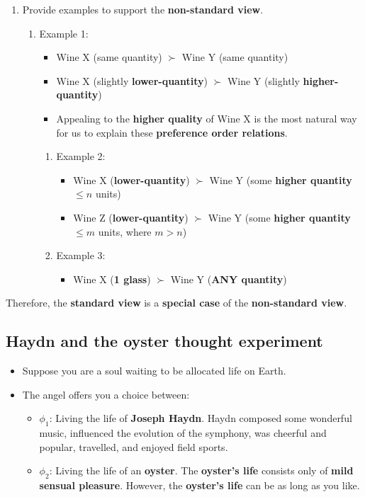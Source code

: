 \documentclass[11pt]{article}
\begin{document}
\begin{enumerate}
\item Provide examples to support the \textbf{non-standard view}.
\begin{enumerate}
\item Example 1:
\begin{itemize}
\item Wine X (same quantity) \(\succ\) Wine Y (same quantity)
\item Wine X (slightly \textbf{lower-quantity}) \(\succ\) Wine Y (slightly \textbf{higher-quantity})
\item Appealing to the \textbf{higher quality} of Wine X is the most natural way for us to explain these \textbf{preference order relations}.
\end{itemize}
\begin{enumerate}
\item Example 2:
\begin{itemize}
\item Wine X (\textbf{lower-quantity}) \(\succ\) Wine Y (some \textbf{higher quantity} \(\le n\) units)
\item Wine Z (\textbf{lower-quantity}) \(\succ\) Wine Y (some \textbf{higher quantity} \(\le m\) units, where \(m > n\))
\end{itemize}
\item Example 3:
\begin{itemize}
\item Wine X (\textbf{1 glass}) \(\succ\) Wine Y (\textbf{ANY quantity})
\end{itemize}
\end{enumerate}
\end{enumerate}
\end{enumerate}

Therefore, the \textbf{standard view} is a \textbf{special case} of the \textbf{non-standard view}.

 \newpage
\subsection{Haydn and the oyster thought experiment}
\label{sec:orgb0d8ca6}
\begin{itemize}
\item Suppose you are a soul waiting to be allocated life on Earth.
\item The angel offers you a choice between:
\begin{itemize}
\item \(\phi_1\): Living the life of \textbf{Joseph Haydn}. Haydn composed some wonderful music, influenced the evolution of the symphony, was cheerful and popular, travelled, and enjoyed field sports.
\item \(\phi_2\): Living the life of an \textbf{oyster}. The \textbf{oyster's life} consists only of \textbf{mild sensual pleasure}. However, the \textbf{oyster's life} can be as long as you like.
\end{itemize}
\end{itemize}
\end{document}

